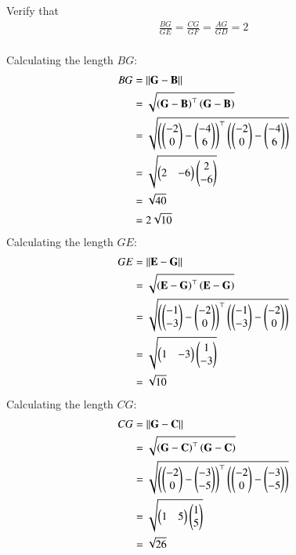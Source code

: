 \documentclass[journal,12pt,twocolumn]{IEEEtran}
\theoremstyle{remark}
\begin{document}
%
Verify that 
\begin{align}
\frac{BG}{GE} = \frac{CG}{GF} = \frac{AG}{GD} = 2
\end{align}
\\\solution
Calculating the length $BG$:
\begin{align}
BG &= \left\lVert\mathbf{G} - \mathbf{B}\right\rVert\\
&= \sqrt{\left(\mathbf{G}-\mathbf{B}\right)^{\top}\left(\mathbf{G}-\mathbf{B}\right)} \\
&= \sqrt{\left(\begin{pmatrix}-2\\0\end{pmatrix} - \begin{pmatrix}-4\\6\end{pmatrix}\right)^{\top}\left(\begin{pmatrix}-2\\0\end{pmatrix} - \begin{pmatrix}-4\\6\end{pmatrix}\right)}\\
&= \sqrt{{\begin{pmatrix}2&-6\end{pmatrix}}\begin{pmatrix}2\\-6\end{pmatrix}}\\
&= \sqrt{40}\\
&= 2\sqrt{10}
\end{align}
Calculating the length $GE$:
\begin{align}
GE &= \left\lVert\mathbf{E} - \mathbf{G}\right\rVert\\
&= \sqrt{\left(\mathbf{E}-\mathbf{G}\right)^{\top}\left(\mathbf{E}-\mathbf{G}\right)} \\
&= \sqrt{\left(\begin{pmatrix}-1\\-3\end{pmatrix} - \begin{pmatrix}-2\\0\end{pmatrix}\right)^{\top}\left(\begin{pmatrix}-1\\-3\end{pmatrix} - \begin{pmatrix}-2\\0\end{pmatrix}\right)}\\
&= \sqrt{{\begin{pmatrix}1&-3\end{pmatrix}}\begin{pmatrix}1\\-3\end{pmatrix}}\\
&= \sqrt{10}
\end{align}
Calculating the length $CG$:
\begin{align}
CG &= \left\lVert\mathbf{G} - \mathbf{C}\right\rVert\\
&= \sqrt{\left(\mathbf{G}-\mathbf{C}\right)^{\top}\left(\mathbf{G}-\mathbf{C}\right)} \\
&= \sqrt{\left(\begin{pmatrix}-2\\0\end{pmatrix} - \begin{pmatrix}-3\\-5\end{pmatrix}\right)^{\top}\left(\begin{pmatrix}-2\\0\end{pmatrix} - \begin{pmatrix}-3\\-5\end{pmatrix}\right)}\\
&= \sqrt{{\begin{pmatrix}1&5\end{pmatrix}}\begin{pmatrix}1\\5\end{pmatrix}}\\
&= \sqrt{26}
\end{align}
\end{document}
